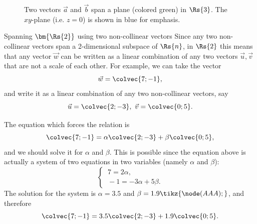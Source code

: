 \begin{figure}
	\centering
	\caption{Two vectors $\vec{a}$ and $\vec{b}$ span a plane (colored green) in $\Rs{3}$. The $xy$-plane (i.e. $z=0$) is shown in blue for emphasis.}
	\label{fig:span of two vectors}
\end{figure}

\begin{example}{Spanning $\bm{\Rs{2}}$ using two non-collinear vectors}{}
	Since any two non-collinear vectors span a 2-dimensional subspace of $\Rs{n}$, in $\Rs{2}$ this means that any vector $\vec{w}$ can be written as a linear combination of any two vectors $\vec{u},\vec{v}$ that are not a scale of each other. For example, we can take the vector
	\[
		\vec{w} = \colvec{7;-1},
	\]
	and write it as a linear combination of any two non-collinear vectors, say
	\[
		\vec{u}=\colvec{2;-3},\ \vec{v}=\colvec{0;5}.
	\]

	The equation which forces the relation is
	\[
		\colvec{7;-1} = \alpha\colvec{2;-3} + \beta\colvec{0;5},
	\]
	and we should solve it for $\alpha$ and $\beta$. This is possible since the equation above is actually a system of two equations in two variables (namely $\alpha$ and $\beta$):
	\[
		\begin{cases}
			\ 7  = 2\alpha,\\
			\ -1 = -3\alpha + 5\beta.
		\end{cases}
	\]
	The solution for the system is $\alpha=3.5$ and $\beta=1.9\tikz{\node(AAA){};}$, and therefore
	\[
		\colvec{7;-1} = 3.5\colvec{2;-3} + 1.9\colvec{0;5}.
	\]
\end{example}


